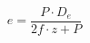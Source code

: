 \documentclass[12pt]{article}
\begin{document}
\begin{displaymath}
e = \frac {P \cdot D_e} {2f \cdot z + P}
\end{displaymath}
\end{document}
